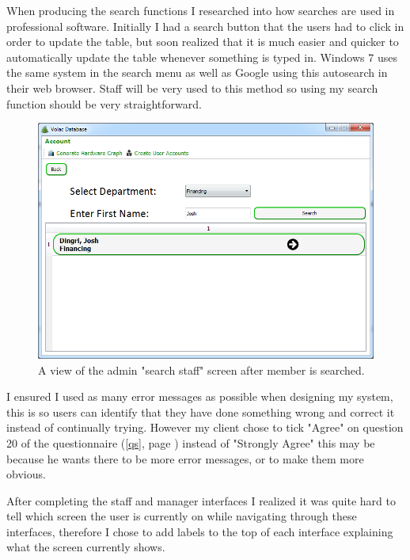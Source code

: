 When producing the search functions I researched into how searches are used in professional software. Initially I had a search button that the users had to click in order to update the table, but soon realized that it is much easier and quicker to automatically update the table whenever something is typed in. Windows 7 uses the same system in the search menu as well as Google using this autosearch in their web browser. Staff will be very used to this method so using my search function should be very straightforward.

\begin{figure}[H]
    \includegraphics[width=\textwidth]{./Evaluation/Images/afteradv.png}
    \caption{A view of the admin "search staff" screen after member is searched.}
\end{figure}

I ensured I used as many error messages as possible when designing my system, this is so users can identify that they have done something wrong and correct it instead of continually trying. However my client chose to tick "Agree" on question 20 of the questionnaire (\ref{qs}, page \pageref{qs}) instead of "Strongly Agree" this may be because he wants there to be more error messages, or to make them more obvious.

After completing the staff and manager interfaces I realized it was quite hard to tell which screen the user is currently on while navigating through these interfaces, therefore I chose to add labels to the top of each interface explaining what the screen currently shows.

